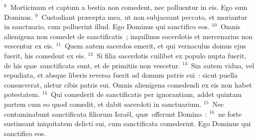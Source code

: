 ${}^{8}$~Morticinum et captum a bestia non comedent, nec polluentur in eis. Ego sum Dominus.
${}^{9}$~Custodiant pr\ae cepta mea, ut non subjaceant peccato, et moriantur in sanctuario, cum polluerint illud. Ego Dominus qui sanctifico eos.
${}^{10}$~Omnis alienigena non comedet de sanctificatis~; inquilinus sacerdotis et mercenarius non vescentur ex eis.
${}^{11}$~Quem autem sacerdos emerit, et qui vernaculus domus ejus fuerit, his comedent ex eis.
${}^{12}$~Si filia sacerdotis cuilibet ex populo nupta fuerit, de his qu\ae\ sanctificata sunt, et de primitiis non vescetur.
${}^{13}$~Sin autem vidua, vel repudiata, et absque liberis reversa fuerit ad domum patris sui~: sicut puella consueverat, aletur cibis patris sui. Omnis alienigena comedendi ex eis non habet potestatem.
${}^{14}$~Qui comederit de sanctificatis per ignorantiam, addet quintam partem cum eo quod comedit, et dabit sacerdoti in sanctuarium.
${}^{15}$~Nec contaminabunt sanctificata filiorum Isra\"el, qu\ae\ offerunt Domino~:
${}^{16}$~ne forte sustineant iniquitatem delicti sui, cum sanctificata comederint. Ego Dominus qui sanctifico eos.


